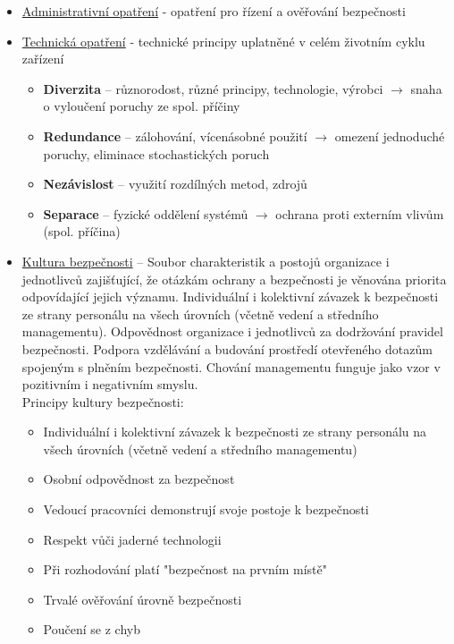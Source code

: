 \begin{itemize}    
	\item \underline{Administrativní opatření} - opatření pro řízení a ověřování bezpečnosti
 
	\item \underline{Technická opatření} - technické principy uplatněné v celém životním cyklu zařízení
        \begin{itemize}
            \item \textbf{Diverzita} -- různorodost, různé principy, technologie, výrobci $\rightarrow$ snaha o vyloučení poruchy ze spol. příčiny
             \item \textbf{Redundance} -- zálohování, vícenásobné použití $\rightarrow$ omezení jednoduché poruchy, eliminace stochastických poruch
            \item \textbf{Nezávislost} -- využití rozdílných metod, zdrojů
            \item \textbf{Separace} -- fyzické oddělení systémů $\rightarrow$ ochrana proti externím vlivům (spol. příčina)
        \end{itemize}
	 
 
 \item  \underline{Kultura bezpečnosti} -- Soubor charakteristik a postojů organizace i jednotlivců zajišťující, že otázkám ochrany a bezpečnosti je věnována priorita odpovídající jejich významu. Individuální i kolektivní závazek k bezpečnosti ze strany personálu na všech úrovních (včetně vedení a středního managementu). Odpovědnost organizace i jednotlivců za dodržování pravidel bezpečnosti. Podpora vzdělávání a budování prostředí otevřeného dotazům spojeným s plněním bezpečnosti. Chování managementu funguje jako vzor v pozitivním i negativním smyslu.
 \\
 Principy kultury bezpečnosti:
    \begin{itemize}\setlength\itemsep{0.1ex}
        \item Individuální i kolektivní závazek k bezpečnosti ze strany personálu na všech úrovních (včetně vedení a středního managementu)
        \item Osobní odpovědnost za bezpečnost
        \item Vedoucí pracovníci demonstrují svoje postoje k bezpečnosti
        \item Respekt vůči jaderné technologii
        \item Při rozhodování platí "bezpečnost na prvním místě"
        \item Trvalé ověřování úrovně bezpečnosti
        \item Poučení se z chyb
    \end{itemize}
\end{itemize}


